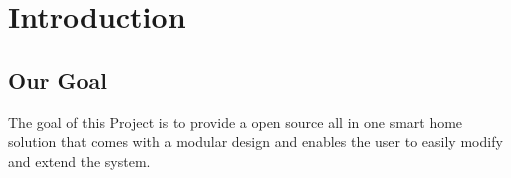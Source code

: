 \chapter{Introduction}
    \section{Our Goal}
        The goal of this Project is to provide a open source
        all in one smart home solution that comes with a modular
        design and enables the user to easily modify and extend
        the system.
    